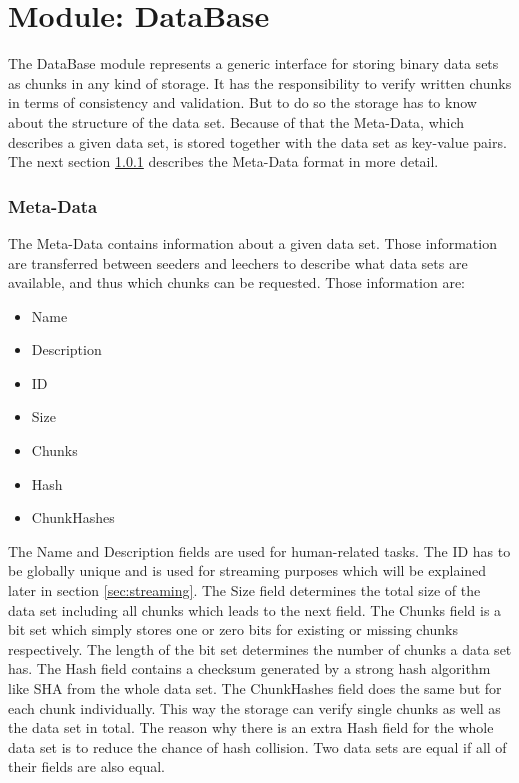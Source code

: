 \cleardoublepage
\section{Module: DataBase}
\label{sec:database}
The DataBase module represents a generic interface for storing binary data sets as chunks in any kind of storage. It has the responsibility to verify written chunks in terms of consistency and validation. But to do so the storage has to know about the structure of the data set. Because of that the Meta-Data, which describes a given data set, is stored together with the data set as key-value pairs. The next section \ref{subsubsec:metadata} describes the Meta-Data format in more detail.

\subsubsection{Meta-Data}
\label{subsubsec:metadata}
The Meta-Data contains information about a given data set. Those information are transferred between seeders and leechers to describe what data sets are available, and thus which chunks can be requested. Those information are:
\begin{itemize} 
\setlength{\parskip}{1pt}
\item Name
\item Description
\item ID
\item Size
\item Chunks
\item Hash
\item ChunkHashes
\end{itemize}
The Name and Description fields are used for human-related tasks. The ID has to be globally unique and is used for streaming purposes which will be explained later in section \ref{sec:streaming}. The Size field determines the total size of the data set including all chunks which leads to the next field. The Chunks field is a bit set which simply stores one or zero bits for existing or missing chunks respectively. The length of the bit set determines the number of chunks a data set has. The Hash field contains a checksum generated by a strong hash algorithm like SHA from the whole data set. The ChunkHashes field does the same but for each chunk individually. This way the storage can verify single chunks as well as the data set in total. The reason why there is an extra Hash field for the whole data set is to reduce the chance of hash collision. Two data sets are equal if all of their fields are also equal.

